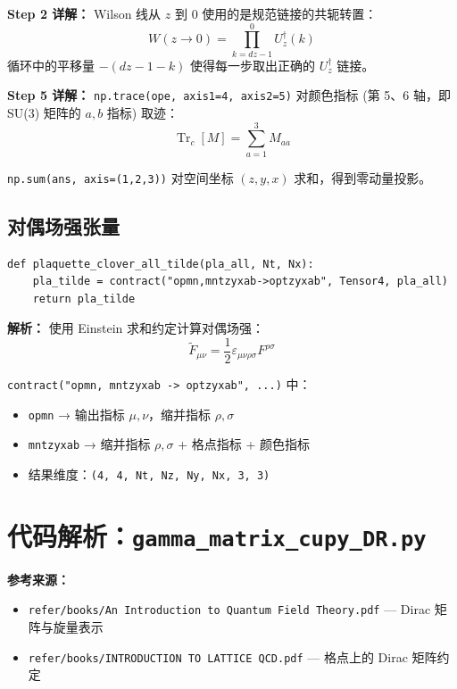 \documentclass[12pt,a4paper]{ctexart}
\begin{document}
\textbf{Step 2 详解：} Wilson 线从 $z$ 到 $0$ 使用的是规范链接的共轭转置：
\begin{equation}
W(z \to 0) = \prod_{k=dz-1}^{0} U_z^\dagger(k)
\end{equation}
循环中的平移量 $-(dz-1-k)$ 使得每一步取出正确的 $U_z^\dagger$ 链接。

\textbf{Step 5 详解：}
\texttt{np.trace(ope, axis1=4, axis2=5)} 对颜色指标 (第 5、6 轴，即 SU(3) 矩阵的 $a,b$ 指标) 取迹：
\begin{equation}
\operatorname{Tr}_c[M] = \sum_{a=1}^{3} M_{aa}
\end{equation}

\texttt{np.sum(ans, axis=(1,2,3))} 对空间坐标 $(z,y,x)$ 求和，得到零动量投影。

\subsection{对偶场强张量}

\begin{lstlisting}[caption={对偶场强张量计算}]
def plaquette_clover_all_tilde(pla_all, Nt, Nx):
    pla_tilde = contract("opmn,mntzyxab->optzyxab", Tensor4, pla_all)
    return pla_tilde
\end{lstlisting}

\textbf{解析：}
使用 Einstein 求和约定计算对偶场强：
\begin{equation}
\tilde{F}_{\mu\nu} = \frac{1}{2} \varepsilon_{\mu\nu\rho\sigma} F^{\rho\sigma}
\end{equation}

\texttt{contract("opmn, mntzyxab -> optzyxab", ...)} 中：
\begin{itemize}
    \item \texttt{opmn} → 输出指标 $\mu, \nu$，缩并指标 $\rho, \sigma$
    \item \texttt{mntzyxab} → 缩并指标 $\rho, \sigma$ + 格点指标 + 颜色指标
    \item 结果维度：\texttt{(4, 4, Nt, Nz, Ny, Nx, 3, 3)}
\end{itemize}

\section{代码解析：\texttt{gamma\_matrix\_cupy\_DR.py}}
\label{sec:gamma}

\textbf{参考来源：}
\begin{itemize}
    \item \texttt{refer/books/An Introduction to Quantum Field Theory.pdf} — Dirac 矩阵与旋量表示
    \item \texttt{refer/books/INTRODUCTION TO LATTICE QCD.pdf} — 格点上的 Dirac 矩阵约定
\end{itemize}
\end{document}
